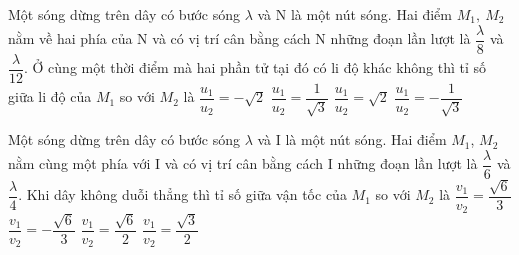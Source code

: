 \begin{vidu}%
Một sóng dừng trên dây có bước sóng $\lambda$ và N là một nút sóng. Hai điểm $M_1,\ M_2$ nằm về hai phía của N và có vị trí cân bằng cách N những đoạn lần lượt là $\dfrac{\lambda }{8}$ và $\dfrac{\lambda }{12}$. Ở cùng một thời điểm mà hai phần tử tại đó có li độ khác không thì tỉ số giữa li độ của $M_1$ so với $M_2$ là
\choice
{\True $\dfrac{u_1}{u_2}=-\sqrt{2}$}
{$\dfrac{u_1}{u_2}=\dfrac{1}{\sqrt{3}}$}
{$\dfrac{u_1}{u_2}=\sqrt{2}$}
{$\dfrac{u_1}{u_2}=-\dfrac{1}{\sqrt{3}}$}
\end{vidu} 
\begin{vidu}%
Một sóng dừng trên dây có bước sóng $\lambda$ và I là một nút sóng. Hai điểm $M_1$, $M_2$ nằm cùng một phía với I và có vị trí cân bằng cách I những đoạn lần lượt là $\dfrac{\lambda }{6}$ và $\dfrac{\lambda }{4}$. Khi dây không duỗi thẳng thì tỉ số giữa vận tốc của $M_1$ so với $M_2$ là
\choice
{$\dfrac{v_1}{v_2}=\dfrac{\sqrt{6}}{3}$}
{$\dfrac{v_1}{v_2}=-\dfrac{\sqrt{6}}{3}$}
{$\dfrac{v_1}{v_2}=\dfrac{\sqrt{6}}{2}$}
{\True $\dfrac{v_1}{v_2}=\dfrac{\sqrt{3}}{2}$}
\end{vidu} 

